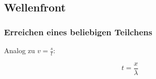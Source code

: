 \subsection{Wellenfront}

\subsubsection{Erreichen eines beliebigen Teilchens}

Analog zu $v=\frac{s}{t}$:

\begin{equation*}
	t=\frac{x}{\lambda}
\end{equation*}
